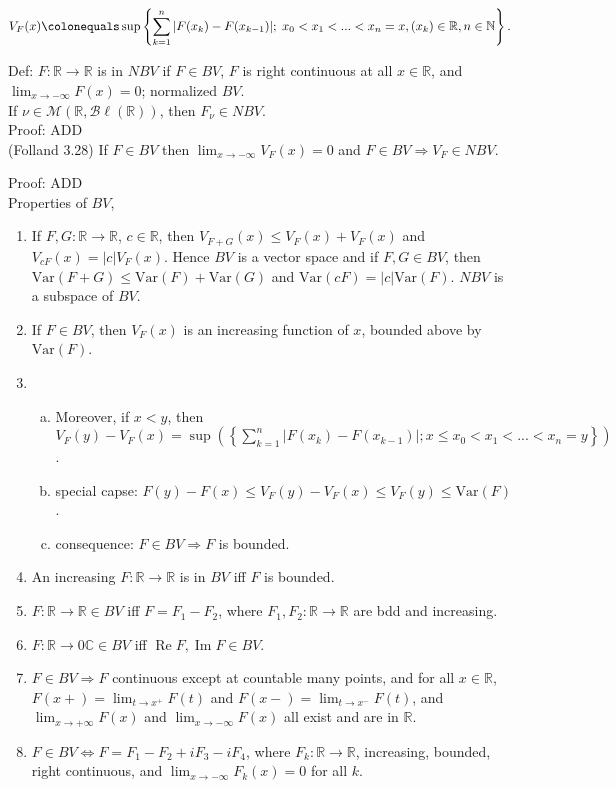 \documentclass[12pt]{article}
\newcommand{\nats}[0] { \mathbb{N}}
\newcommand{\reals}[0] { \mathbb{R}}
\newcommand{\complexes}[0] { \mathbb{C}}
\newcommand{\M}[0] { \mathcal{M} }
\newcommand{\Bl}[0] { \mathcal{B} \ell }
\renewcommand{\Re}{ \operatorname{Re} }
\renewcommand{\Im}{ \operatorname{Im} }
\newcommand{\rimply}[0] { \Rightarrow }
\newcommand{\lrimply}[0] { \Leftrightarrow }
\newcommand{\rarw}[0] { \rightarrow }
\newcommand{ \defeq }[0] { \colonequals }
\newcommand{ \Var } { \textrm{Var} }
\begin{document}
$$
V_F(x) \defeq \sup \left\{  \sum_{k=1}^n |F(x_k) - F(x_{k-1})| ; \;  x_0    < x_1 < ... < x_n=x, ( x_k ) \in \reals, n \in \nats \right\}.
$$

Def: $F: \reals \rarw \reals$ is in $NBV$ if $F \in BV$, $F$ is right continuous at all $x \in \reals$, and $\lim_{x \rarw -\infty} F(x) = 0$; normalized $BV$.\\

If $\nu \in \M(\reals, \Bl(\reals))$, then $F_\nu \in NBV$. \\

\noindent
Proof: ADD \\


(Folland 3.28) If $F \in BV$ then $\lim_{x \rarw - \infty} V_F(x) = 0$ and $F \in BV \rimply V_F \in NBV$.

\noindent
Proof: ADD \\


Properties of $BV$,

\begin{enumerate}[1)]
\item
If $F,G: \reals \rarw \reals$, $c \in \reals$, then $V_{F+G}(x) \le V_F(x) + V_F(x)$ and $V_{cF}(x) = |c| V_F(x)$. Hence $BV$ is a vector space and if $F,G \in BV$, then $\Var(F+G) \le \Var(F) + \Var(G)$ and $\Var(cF) = |c| \Var(F)$. $NBV$ is a subspace of $BV$.
\item
If $F \in BV$, then $V_F(x)$ is an increasing function of $x$, bounded above by $\Var(F)$.
\item
\begin{enumerate}[a)]
\item
Moreover, if $x < y$, then $V_F(y)-V_F(x) = \sup \left( \left\{ \sum_{k=1}^n | F(x_k) - F(x_{k-1}) | ; x \le x_0 < x_1 < ... < x_{n} = y \right\} \right)$.
\item
special capse: $F(y) - F(x) \le V_F(y) - V_F(x) \le V_F(y) \le \Var(F)$.
\item
consequence: $F \in BV \rimply F$ is bounded.
\end{enumerate}
\item
An increasing $F: \reals \rarw \reals$ is in $BV$ iff $F$ is bounded.
\item
$F: \reals \rarw \reals \in BV$ iff $F =  F_1-F_2$, where $F_1,F_2: \reals \rarw \reals$ are bdd and increasing.
\item
$F: \reals \rarw0 \complexes \in BV$ iff $\Re F, \Im F \in BV$.
\item
$F \in BV \rimply F$ continuous except at countable many points, and for all $x \in \reals$, $F(x+) = \lim_{t \rarw x^+} F(t)$ and $F(x-) = \lim_{t \rarw x^-} F(t)$, and $\lim_{x \rarw +\infty} F(x)$ and $\lim_{x \rarw -\infty} F(x)$ all exist and are in $\reals$.
\item
 $F \in BV \lrimply F = F_1 - F_2 + i F_3 - i F_4$, where $F_k : \reals \rarw \reals$, increasing, bounded, right continuous, and $\lim_{x \rarw - \infty} F_k(x) = 0$ for all $k$.
\end{enumerate}
\end{document}
